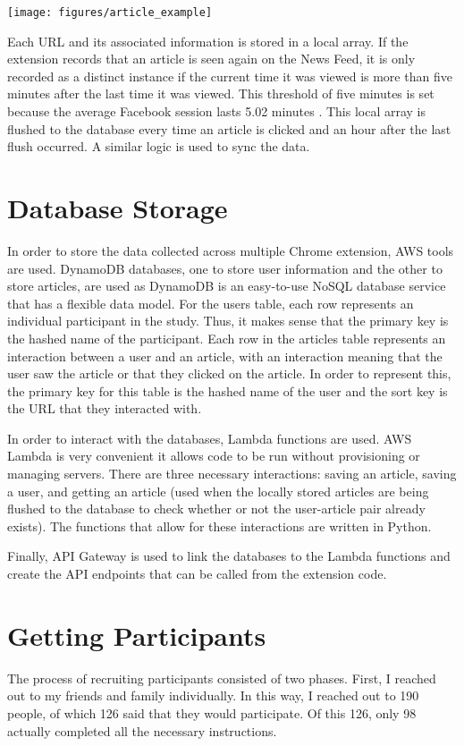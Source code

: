 \texttt{[image: figures/article\_example]}

Each URL and its associated information is stored in a local array.  If the extension records that an article is seen again on the News Feed, it is only recorded as a distinct instance if the current time it was viewed is more than five minutes after the last time it was viewed.  This threshold of five minutes is set because the average Facebook session lasts 5.02 minutes \cite{fbtime}.  This local array is flushed to the database every time an article is clicked and an hour after the last flush occurred.  A similar logic is used to sync the data.

\section{Database Storage} \label{ch:storage}
In order to store the data collected across multiple Chrome extension, AWS tools are used.  DynamoDB databases, one to store user information and the other to store articles, are used as DynamoDB is an easy-to-use NoSQL database service that has a flexible data model.  For the users table, each row represents an individual participant in the study.  Thus, it makes sense that the primary key is the hashed name of the participant.  Each row in the articles table represents an interaction between a user and an article, with an interaction meaning that the user saw the article or that they clicked on the article.  In order to represent this, the primary key for this table is the hashed name of the user and the sort key is the URL that they interacted with.

In order to interact with the databases, Lambda functions are used.  AWS Lambda is very convenient it allows code to be run without provisioning or managing servers.  There are three necessary interactions: saving an article, saving a user, and getting an article (used when the locally stored articles are being flushed to the database to check whether or not the user-article pair already exists).  The functions that allow for these interactions are written in Python.

Finally, API Gateway is used to link the databases to the Lambda functions and create the API endpoints that can be called from the extension code.

\section{Getting Participants} \label{ch:participants}
The process of recruiting participants consisted of two phases.  First, I reached out to my friends and family individually.  In this way, I reached out to 190 people, of which 126 said that they would participate.  Of this 126, only 98 actually completed all the necessary instructions.

